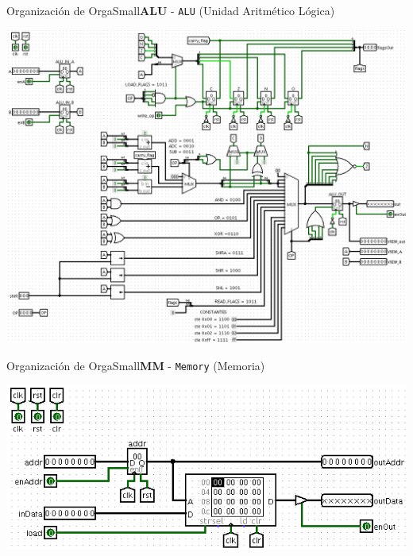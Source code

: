 \documentclass[aspectratio=169]{beamer}
\begin{document}
\begin{frame}[fragile,t]{Organización de OrgaSmall}{\textbf{ALU} - \texttt{ALU} (Unidad Aritmético Lógica)}
    \begin{center} \includegraphics[scale=0.9]{img/3_ALU.png} \end{center}
\end{frame}

\begin{frame}[fragile,t]{Organización de OrgaSmall}{\textbf{MM} - \texttt{Memory} (Memoria)}
    \begin{center} \includegraphics[scale=1.3]{img/4_Memory.png} \end{center}
\end{frame}
\end{document}
